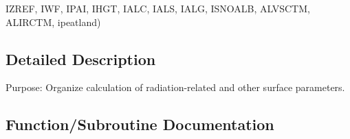 \begin{DoxyCompactItemize}
I\+Z\+R\+E\+F, I\+W\+F, I\+P\+A\+I, I\+H\+G\+T, I\+A\+L\+C, I\+A\+L\+S, I\+A\+L\+G, I\+S\+N\+O\+A\+L\+B, A\+L\+V\+S\+C\+T\+M, A\+L\+I\+R\+C\+T\+M, ipeatland)
\end{DoxyCompactItemize}


\subsection{Detailed Description}
Purpose\+: Organize calculation of radiation-\/related and other surface parameters. 



\subsection{Function/\+Subroutine Documentation}
\hypertarget{CLASSA_8f_a4ba5845339f63dd223722f0e0593c72e}{}
